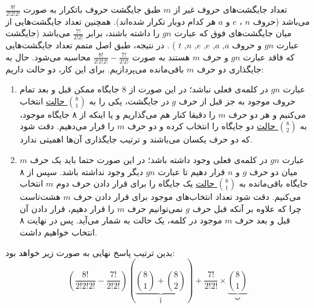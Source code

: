 \p
تعداد جایگشت‌های حروف غیر از $m$
طبق جایگشت‌ حروف باتکرار به صورت 
$\frac{8!}{2!2!2!}$
می‌باشد
(حروف $n$ ، $e$ و $a$ هر کدام دوبار تکرار شده‌اند).
 همچنین تعداد جایگشت‌هایی از میان جایگشت‌های فوق که عبارت
 $gn$ 
 را داشته باشند، برابر
 \underline{$\frac{7!}{2!2!}$} 
  می‌باشد 
  (جایگشت عبارت
  $gn$
  و حروف
  $a$, 
  $a$, 
  $e$, 
  $e$, 
  $n$, 
  $t$
  )
  . 
 در نتیجه، طبق اصل متمم تعداد جایگشت‌هایی که فاقد عبارت 
  $gn$
  و حرف 
  $m$   
  هستند به صورت  
  \underline{$\frac{8!}{2!2!2!} - \frac{7!}{2!2!}$} 
  محاسبه می‌شود.
حال به جایگذاری دو حرف 
$m$
 باقی‌مانده می‌پردازیم. برای این کار، دو حالت داریم:
\begin{enumerate}
  \item 
  عبارت 
  $gn$ 
 در کلمه‌ی فعلی نباشد؛
 در این صورت از 8 جایگاه ممکن 
  قبل و بعد تمام حروف موجود به جز قبل از حرف $g$ در جایگشت، 
یکی را به 
\underline{${8\choose 1}$ حالت}
 انتخاب می‌کنیم و هر دو حرف $m$ را دقیقا کنار هم می‌گذاریم
 و یا اینکه از ۸ جایگاه موجود، به 
\underline{${8\choose 2}$ حالت}
دو جایگاه را انتخاب کرده و دو حرف
 $m$
 را قرار می‌دهیم.
دقت شود که دو حرف یکسان می‌باشند و ترتیب جایگذاری آن‌ها اهمیتی ندارد.

  \item
  عبارت $gn$ 
  در کلمه‌ی فعلی وجود داشته ‌باشد؛
  در این صورت حتما باید یک حرف $m$ میان دو حرف 
  $g$ و $n$ قرار دهیم تا عبارت $gn$ دیگر وجود نداشته باشد.
  سپس از ۸ جایگاه باقی‌مانده به 
  \underline{${8\choose 1}$ حالت}
  یک جایگاه را برای قرار دادن حرف دوم $m$ انتخاب می‌کنیم. دقت شود تعداد انتخاب‌های موجود برای قرار دادن حرف $m$ هشت‌تاست چرا که علاوه بر آنکه قبل حرف $g$ نمی‌توانیم حرف $m$ را قرار دهیم، قرار دادن آن قبل و بعد حرف $m$ موجود در کلمه، یک حالت به شمار می‌آید. پس در نهایت ۸ انتخاب خواهیم داشت.
  
\end{enumerate}
\p
بدین ترتیب پاسخ نهایی به صورت زیر خواهد بود:
$$(\frac{8!}{2!2!2!} - \frac{7!}{2!2!})(\underbrace{{8\choose 1} + {8\choose 2}}_{\text{آ}}) + \frac{7!}{2!2!} \times \underbrace{{8\choose 1}}_{\text{ب}}$$
